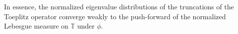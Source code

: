 \documentclass[article]{amsart}
\begin{document}
In essence, the normalized eigenvalue distributions of the truncations of the Toeplitz operator converge weakly to the push-forward of the normalized Lebesgue measure on $\mathbb{T}$ under $\phi$.\\




\end{document}
